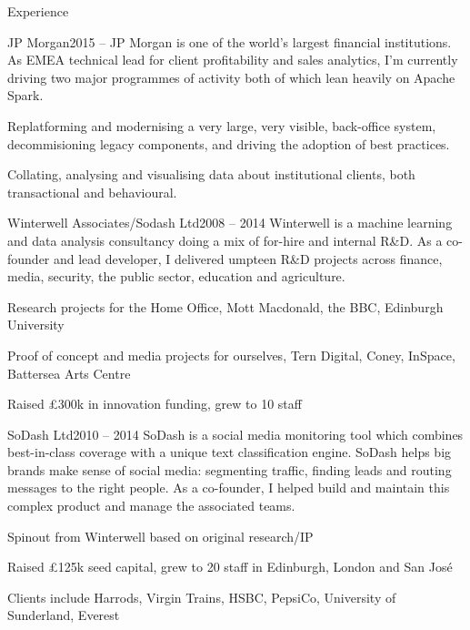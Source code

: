 \documentclass{resume} %
\begin{document}
\begin{rSection}{Experience}

\begin{rSubsection}{JP Morgan}{2015 -- }
{JP Morgan is one of the world's largest financial institutions. As EMEA technical lead
for client profitability and sales analytics, I'm currently driving two major
programmes of activity both of which lean heavily on Apache Spark.}{}
\item Replatforming and modernising a very large, very visible, back-office system, decommisioning legacy components, and driving the adoption of best practices.
\item Collating, analysing and visualising data about institutional clients, both transactional and behavioural.
\end{rSubsection}

\begin{rSubsection}{Winterwell Associates/Sodash Ltd}{2008 -- 2014}
{Winterwell is a machine learning and data analysis consultancy doing a mix of for-hire and internal R\&D. As a co-founder and lead developer, I delivered umpteen R\&D projects across finance, media, security, the public sector, education and agriculture.}{}
\item Research projects for the Home Office, Mott Macdonald, the BBC, Edinburgh University
\item Proof of concept and media projects for ourselves, Tern Digital, Coney, InSpace, Battersea Arts Centre
\item Raised £300k in innovation funding, grew to 10 staff
\end{rSubsection}

\clearpage


\begin{rSubsection}{SoDash Ltd}{2010 -- 2014}
{SoDash is a social media monitoring tool which combines best-in-class coverage
with a unique text classification engine. SoDash helps big brands make sense of
social media: segmenting traffic, finding leads and routing messages to the right people.
As a co-founder, I helped build and maintain this complex product and manage the associated teams.}{}
\item Spinout from Winterwell based on original research/IP
\item Raised £125k seed capital, grew to 20 staff in Edinburgh, London and San José
\item Clients include Harrods, Virgin Trains, HSBC, PepsiCo, University of Sunderland, Everest
\end{rSubsection}


\end{rSection}
\end{document}
